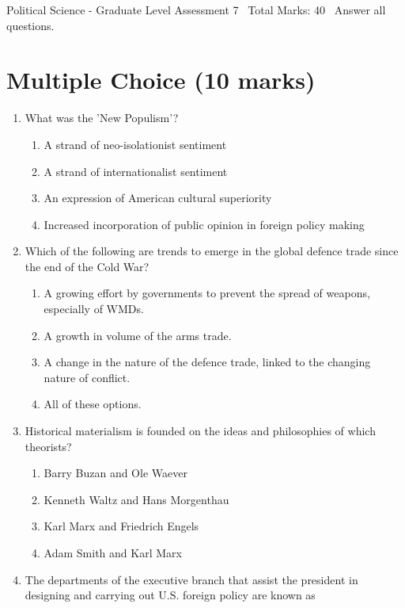 \documentclass[12pt]{article}
\begin{document}
\begin{center}
Political Science - Graduate Level Assessment 7 \
Total Marks: 40 \
Answer all questions.
\end{center}

\section*{Multiple Choice (10 marks)}
\begin{enumerate}[label=\arabic*.]
\item What was the 'New Populism'?
\begin{enumerate}[label=(\alph*)]
    \item A strand of neo-isolationist sentiment
    \item A strand of internationalist sentiment
    \item An expression of American cultural superiority
    \item Increased incorporation of public opinion in foreign policy making
\end{enumerate}
\item Which of the following are trends to emerge in the global defence trade since the end of the Cold War?
\begin{enumerate}[label=(\alph*)]
    \item A growing effort by governments to prevent the spread of weapons, especially of WMDs.
    \item A growth in volume of the arms trade.
    \item A change in the nature of the defence trade, linked to the changing nature of conflict.
    \item All of these options.
\end{enumerate}
\item Historical materialism is founded on the ideas and philosophies of which theorists?
\begin{enumerate}[label=(\alph*)]
    \item Barry Buzan and Ole Waever
    \item Kenneth Waltz and Hans Morgenthau
    \item Karl Marx and Friedrich Engels
    \item Adam Smith and Karl Marx
\end{enumerate}
\item The departments of the executive branch that assist the president in designing and carrying out U.S. foreign policy are known as
\begin{enumerate}[label=(\alph*)]

\end{enumerate}
\end{enumerate}
\end{document}
